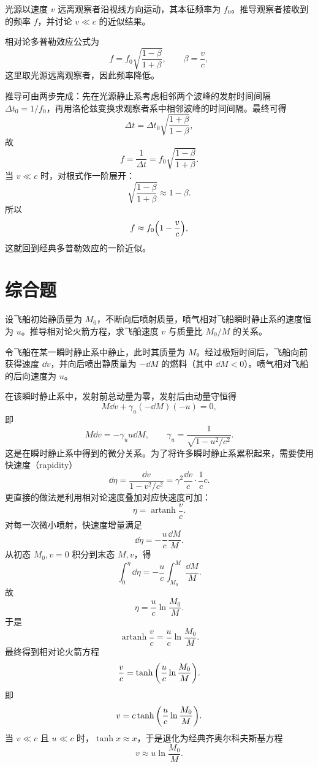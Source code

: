 \begin{university}
光源以速度 $v$ 远离观察者沿视线方向运动，其本征频率为 $f_0$。推导观察者接收到的频率 $f$，并讨论 $v\ll c$ 的近似结果。
\begin{solution}
相对论多普勒效应公式为
\[
 f=f_0\sqrt{\frac{1-\beta}{1+\beta}},
 \qquad \beta=\frac{v}{c},
\]
这里取光源远离观察者，因此频率降低。

推导可由两步完成：先在光源静止系考虑相邻两个波峰的发射时间间隔 $\Delta t_0=1/f_0$，再用洛伦兹变换求观察者系中相邻波峰的时间间隔。最终可得
\[
\Delta t=\Delta t_0\sqrt{\frac{1+\beta}{1-\beta}},
\]
故
\[
 f=\frac{1}{\Delta t}=f_0\sqrt{\frac{1-\beta}{1+\beta}}.
\]
当 $v\ll c$ 时，对根式作一阶展开：
\[
\sqrt{\frac{1-\beta}{1+\beta}}\approx 1-\beta.
\]
所以
\[
 f\approx f_0\qty(1-\frac{v}{c}),
\]
这就回到经典多普勒效应的一阶近似。
\end{solution}
\end{university}

\section{综合题}

\begin{problem}
设飞船初始静质量为 $M_0$，不断向后喷射质量，喷气相对飞船瞬时静止系的速度恒为 $u$。推导相对论火箭方程，求飞船速度 $v$ 与质量比 $M_0/M$ 的关系。
\begin{solution}
令飞船在某一瞬时静止系中静止，此时其质量为 $M$。经过极短时间后，飞船向前获得速度 $\dd{v}$，并向后喷出静质量为 $-\dd{M}$ 的燃料（其中 $\dd{M}<0$）。喷气相对飞船的后向速度为 $u$。

在该瞬时静止系中，发射前总动量为零，发射后由动量守恒得
\[
M\dd{v}+\gamma_u(-\dd{M})(-u)=0,
\]
即
\[
M\dd{v}=-\gamma_u u\dd{M},
\qquad
\gamma_u=\frac{1}{\sqrt{1-u^2/c^2}}.
\]
这是在瞬时静止系中得到的微分关系。为了将许多瞬时静止系累积起来，需要使用快速度（rapidity）
\[
\dd{\eta}=\frac{\dd{v}}{1-v^2/c^2}=\gamma^2\frac{\dd{v}}{c}\cdot\frac{1}{c}c.
\]
更直接的做法是利用相对论速度叠加对应快速度可加：
\[
\eta=\operatorname{artanh}\frac{v}{c}.
\]
对每一次微小喷射，快速度增量满足
\[
\dd{\eta}=-\frac{u}{c}\frac{\dd{M}}{M}.
\]
从初态 $M_0,v=0$ 积分到末态 $M,v$，得
\[
\int_0^{\eta}\dd{\eta}=-\frac{u}{c}\int_{M_0}^{M}\frac{\dd{M}}{M}.
\]
故
\[
\eta=\frac{u}{c}\ln\frac{M_0}{M}.
\]
于是
\[
\operatorname{artanh}\frac{v}{c}=\frac{u}{c}\ln\frac{M_0}{M}.
\]
最终得到相对论火箭方程
\[
\frac{v}{c}=\tanh\qty(\frac{u}{c}\ln\frac{M_0}{M}).
\]
即
\[
 v=c\tanh\qty(\frac{u}{c}\ln\frac{M_0}{M}).
\]
当 $v\ll c$ 且 $u\ll c$ 时，$\tanh x\approx x$，于是退化为经典齐奥尔科夫斯基方程
\[
 v\approx u\ln\frac{M_0}{M}.
\]
\end{solution}
\end{problem}

